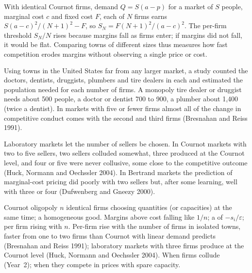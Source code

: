 With identical Cournot firms, demand $Q = S(a - p)$ for a market of $S$ people,
marginal cost $c$ and fixed cost $F$, each of $N$ firms earns
$S(a - c)^2/(N + 1)^2 - F$, so $S_N = F(N + 1)^2/(a - c)^2$. The per-firm threshold $S_N/N$ rises
because margins fall as firms enter; if margins did not fall, it would be
flat. Comparing towns of different sizes thus measures how fast
competition erodes margins without observing a single price or cost.

\begin{record}
Using towns in the United States far from any larger market, a study
counted the doctors, dentists, druggists, plumbers and tire dealers in
each and estimated the population needed for each number of firms. A
monopoly tire dealer or druggist needs about 500 people, a doctor or
dentist 700 to 900, a plumber about 1,400 (twice a dentist). %
In markets with five or fewer firms almost all of the change in
competitive conduct comes with the second and third firms (Bresnahan and
Reiss 1991). %
\end{record}

\begin{record}
Laboratory markets let the number of sellers be chosen. In Cournot
markets with two to five sellers, two sellers colluded somewhat, three
produced at the Cournot level, and four or five were never collusive, some
close to the competitive outcome (Huck, Normann and Oechssler 2004). %
In Bertrand markets the prediction of marginal-cost pricing did poorly
with two sellers but, after some learning, well with three or four
(Dufwenberg and Gneezy 2000). %
\end{record}

\begin{model}{Cournot oligopoly}
\assumes $n$ identical firms choosing quantities (or capacities) at the
same time; a homogeneous good.
\predicts Margins above cost falling like $1/n$; a  of $-s_i/\varepsilon$;
 per firm rising with $n$.
\tested Per-firm  rise with the number of firms in
isolated towns, faster from one to two firms than Cournot with linear
demand predicts (Bresnahan and Reiss 1991); %
laboratory markets with three firms produce at the Cournot level (Huck,
Normann and Oechssler 2004). %
\breaks When firms collude (Year~2); when they compete in prices with
spare capacity.
\end{model}

